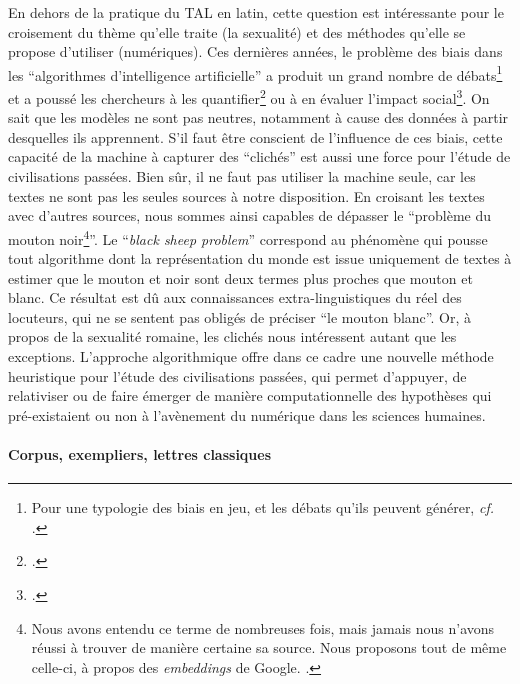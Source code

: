 En dehors de la pratique du TAL en latin, cette question est intéressante pour le croisement du thème qu'elle traite (la sexualité) et des méthodes qu'elle se propose d'utiliser (numériques). Ces dernières années, le problème des biais dans les \enquote{algorithmes d'intelligence artificielle} a produit un grand nombre de débats\footnote{Pour une typologie des biais en jeu, et les débats qu'ils peuvent générer, \textit{cf.} \textcite{mehrabi2021survey}.} et a poussé les chercheurs à les quantifier\footcite{bolukbasi2016quantifying} ou à en évaluer l'impact social\footcite{doi:10.1126/science.aal4230}. On sait que les modèles ne sont pas neutres, notamment à cause des données à partir desquelles ils apprennent. S'il faut être conscient de l'influence de ces biais, cette capacité de la machine à capturer des \enquote{clichés} est aussi une force pour l'étude de civilisations passées. Bien sûr, il ne faut pas utiliser la machine seule, car les textes ne sont pas les seules sources à notre disposition. En croisant les textes avec d'autres sources, nous sommes ainsi capables de dépasser le \enquote{problème du mouton noir\footnote{Nous avons entendu ce terme de nombreuses fois, mais jamais nous n'avons réussi à trouver de manière certaine sa source. Nous proposons tout de même celle-ci, à propos des \textit{embeddings} de Google. \textcite{daume_blacksheep_2016}.}}. Le \enquote{\textit{black sheep problem}} correspond au phénomène qui pousse tout algorithme dont la représentation du monde est issue uniquement de textes à estimer que le mouton et noir sont deux termes plus proches que mouton et blanc. Ce résultat est dû aux connaissances extra-linguistiques du réel des locuteurs, qui ne se sentent pas obligés de préciser \enquote{le mouton blanc}. Or, à propos de la sexualité romaine, les clichés nous intéressent autant que les exceptions. L'approche algorithmique offre dans ce cadre une nouvelle méthode heuristique pour l'étude des civilisations passées, qui permet d'appuyer, de relativiser ou de faire émerger de manière computationnelle des hypothèses qui pré-existaient ou non à l'avènement du numérique dans les sciences humaines.

\paragraph{Corpus, exempliers, lettres classiques}

